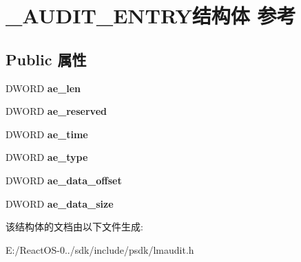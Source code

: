 \hypertarget{struct___a_u_d_i_t___e_n_t_r_y}{}\section{\+\_\+\+A\+U\+D\+I\+T\+\_\+\+E\+N\+T\+R\+Y结构体 参考}
\label{struct___a_u_d_i_t___e_n_t_r_y}
\subsection*{Public 属性}
\begin{DoxyCompactItemize}
\item 
\mbox{\label{struct___a_u_d_i_t___e_n_t_r_y_ae21061e178e8615e41cd93a6cfe5c023}} 
D\+W\+O\+RD {\bfseries ae\+\_\+len}
\item 
\mbox{\label{struct___a_u_d_i_t___e_n_t_r_y_a1753df60195d88ddf7a91df0d0b272f7}} 
D\+W\+O\+RD {\bfseries ae\+\_\+reserved}
\item 
\mbox{\label{struct___a_u_d_i_t___e_n_t_r_y_a67824bb6fead0b8c6956b7eaf867b3c9}} 
D\+W\+O\+RD {\bfseries ae\+\_\+time}
\item 
\mbox{\label{struct___a_u_d_i_t___e_n_t_r_y_a3974c2aa8ee16823f8ee673a50da3a6e}} 
D\+W\+O\+RD {\bfseries ae\+\_\+type}
\item 
\mbox{\label{struct___a_u_d_i_t___e_n_t_r_y_a6ca4117867aab00c877923bba7707e28}} 
D\+W\+O\+RD {\bfseries ae\+\_\+data\+\_\+offset}
\item 
\mbox{\label{struct___a_u_d_i_t___e_n_t_r_y_a133dd0df0bbbb9fc53899731a134a2cd}} 
D\+W\+O\+RD {\bfseries ae\+\_\+data\+\_\+size}
\end{DoxyCompactItemize}


该结构体的文档由以下文件生成\+:\begin{DoxyCompactItemize}
\item 
E\+:/\+React\+O\+S-\/0../sdk/include/psdk/lmaudit.\+h\end{DoxyCompactItemize}
